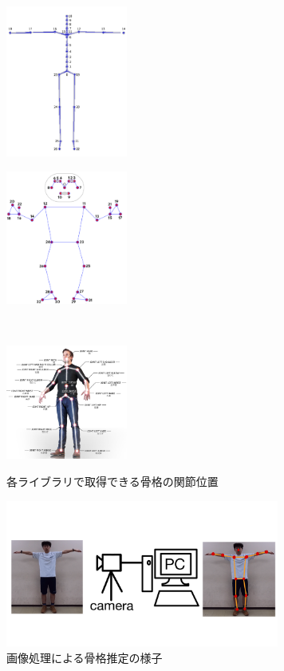 \documentclass[a4j, fleqn, 12pt]{jsreport}
\begin{document}
\begin{figure}[t]
  \centering
  \begin{minipage}[]{0.45\hsize}
    \centering
    \includegraphics[width=4cm]{img/TechSpec_02.png}
    \label{mocopi}
  \end{minipage}
  \begin{minipage}[]{0.45\hsize}
    \centering
    \includegraphics[width=4cm]{img/media.png}
    \label{RGB}
  \end{minipage}\\
  \begin{minipage}[]{0.45\hsize}
    \centering
    \includegraphics[width=4cm]{img/nuitrack.png}
    \label{RGBD}
  \end{minipage}
  \caption{各ライブラリで取得できる骨格の関節位置}
  \label{sokutei}
\end{figure}
\begin{figure}[b]
  \centering
  \includegraphics[width=9cm]{img/image_3D.png}
  \caption{画像処理による骨格推定の様子}
  \label{image_3D}
\end{figure}
\end{document}
